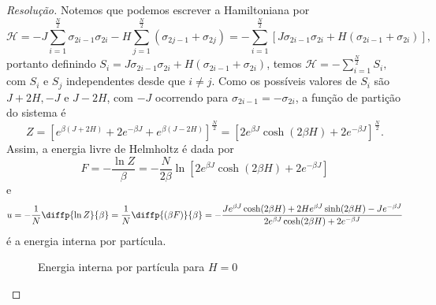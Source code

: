 \begin{proof}[Resolução]
    Notemos que podemos escrever a Hamiltoniana por
    \begin{equation*}
        \mathcal{H} = -J \sum_{i=1}^{\frac{N}{2}} \sigma_{2i - 1} \sigma_{2i} - H\sum_{j=1}^{\frac{N}{2}} \left(\sigma_{2j-1} + \sigma_{2j}\right) = -\sum_{i = 1}^{\frac{N}{2}} \left[J \sigma_{2i-1} \sigma_{2i} + H\left(\sigma_{2i-1} + \sigma_{2i}\right)\right],
    \end{equation*}
    portanto definindo \(S_i = J \sigma_{2i -1} \sigma_{2i} + H(\sigma_{2i - 1} + \sigma_{2i})\), temos \(\mathcal{H} = - \sum_{i = 1}^{\frac{N}{2}}S_i,\) com \(S_i\) e \(S_j\) independentes desde que \(i \neq j\). Como os possíveis valores de \(S_i\) são \(J + 2H, -J\) e \(J - 2H\), com \(-J\) ocorrendo para \(\sigma_{2i-1} = - \sigma_{2i}\), a função de partição do sistema é
    \begin{equation*}
        Z = \left[e^{\beta (J + 2H)} + 2 e^{-\beta J} + e^{\beta (J - 2H)}\right]^{\frac{N}{2}} = \left[2e^{\beta J}\cosh(2\beta H) + 2 e^{-\beta J}\right]^{\frac{N}{2}}.
    \end{equation*}
    Assim, a energia livre de Helmholtz é dada por
    \begin{equation*}
        F = - \frac{\ln Z}{\beta} = - \frac{N}{2 \beta} \ln\left[2e^{\beta J}\cosh(2\beta H) + 2 e^{-\beta J}\right]
    \end{equation*}
    e
    \begin{equation*}
        u = -\frac{1}{N} \diffp{\ln Z}{\beta} = \frac{1}{N} \diffp{(\beta F)}{\beta} =-\frac{J e^{\beta J} \cosh(2 \beta H) + 2H e^{\beta J}\sinh(2\beta H)-J e^{-\beta J}}{2e^{\beta J}\cosh(2\beta H) +  2e^{-\beta J}}
    \end{equation*}
    é a energia interna por partícula.
    \begin{figure}[!ht]
        \centering
        \caption{Energia interna por partícula para \(H = 0\)}
    \end{figure}


\end{proof}
